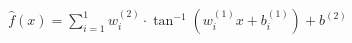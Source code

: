 \documentclass[preview]{standalone}
\begin{document}
\begin{align*}
\hat{f}(x) = \sum_{i=1}^{1} w^{(2)}_i \cdot \tan^{-1} \left( w^{(1)}_i x + b^{(1)}_i \right) + b^{(2)}
\end{align*}
\end{document}
